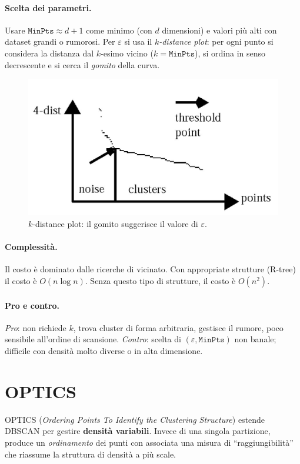 \paragraph{Scelta dei parametri.}
Usare $\texttt{MinPts}\approx d{+}1$ come minimo (con $d$ dimensioni) e valori più alti con dataset grandi o rumorosi. Per $\varepsilon$ si usa il \emph{$k$-distance plot}: per ogni punto si considera la distanza dal $k$-esimo vicino ($k=\texttt{MinPts}$), si ordina in senso decrescente e si cerca il \emph{gomito} della curva.

\begin{figure}[htbp]
  \centering
  \includegraphics[width=.68\textwidth]{images/kdistance_plot.png}
  \caption{$k$-distance plot: il gomito suggerisce il valore di $\varepsilon$.}
  \label{fig:kdist}
\end{figure}

\paragraph{Complessità.}
Il costo è dominato dalle ricerche di vicinato. Con appropriate strutture (R-tree) il costo è $O(n\log n)$. Senza questo tipo di strutture, il costo è $O(n^2)$.
\paragraph{Pro e contro.}
\emph{Pro}: non richiede $k$, trova cluster di forma arbitraria, gestisce il rumore, poco sensibile all’ordine di scansione.  
\emph{Contro}: scelta di $(\varepsilon,\texttt{MinPts})$ non banale; difficile con densità molto diverse o in alta dimensione.


\section{OPTICS}\label{sec:optics}
OPTICS (\emph{Ordering Points To Identify the Clustering Structure}) estende DBSCAN per gestire \textbf{densità variabili}. Invece di una singola partizione, produce un \emph{ordinamento} dei punti con associata una misura di “raggiungibilità” che riassume la struttura di densità a più scale.

